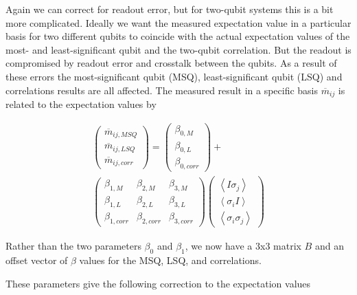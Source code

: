 Again we can correct for readout error, but for two-qubit systems this is a bit
more complicated. Ideally we want the measured expectation value in a particular
basis for two different qubits to coincide with the actual expectation values of
the most- and least-significant qubit and the two-qubit correlation. But the
readout is compromised by readout error and crosstalk between the qubits. As a
result of these errors the most-significant qubit (MSQ), least-significant qubit
(LSQ) and correlations results are all affected. The measured result
in a specific basis $\overline{m}_{ij}$ is related to the expectation values by

\begin{equation}
\label{beta}
\begin{split}
\begin{pmatrix} \overline{m}_{ij,MSQ} \\ \overline{m}_{ij,LSQ} \\
\overline{m}_{ij,corr}
\end{pmatrix}=\begin{pmatrix} \beta_{0,M} \\ \beta_{0,L} \\ \beta_{0,corr}
\end{pmatrix}+\\\begin{pmatrix} \beta_{1,M}&\beta_{2,M}&\beta_{3,M} \\
\beta_{1,L}&\beta_{2,L}&\beta_{3,L} \\
\beta_{1,corr}&\beta_{2,corr}&\beta_{3,corr}
\end{pmatrix}\begin{pmatrix} \left\langle I\sigma_j\right\rangle \\ \left\langle
\sigma_iI\right\rangle \\ \left\langle \sigma_i\sigma_j\right\rangle
\end{pmatrix}
\end{split}
\end{equation}

Rather than the two parameters $\beta_0$ and $\beta_1$, we now have a 3x3
matrix $B$ and an offset vector of $\beta$ values for the MSQ, LSQ, and
correlations. 

These parameters give the following correction to the expectation values

